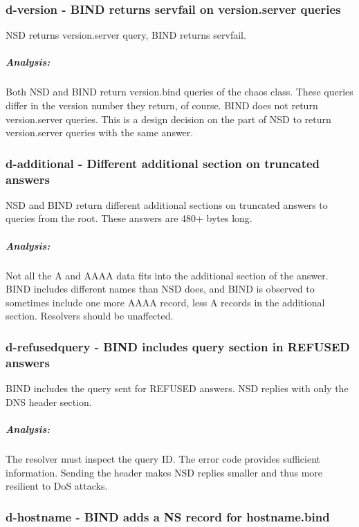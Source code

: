 \documentclass[twoside,titlepage,english]{nlnetlabs}
\begin{document}
\subsubsection{d-version - BIND returns servfail on version.server queries}
\label{d-version}

NSD returns version.server query, BIND returns servfail.

\vspace{-8pt}\subparagraph{Analysis:}

Both NSD and BIND return version.bind queries of the chaos class.
These queries differ in the version number they return, of course.
BIND does not return version.server queries. This is a design decision
on the part of NSD to return version.server queries with the same answer.


\subsubsection{d-additional - Different additional section on truncated answers}
\label{d-additional}

NSD and BIND return different additional sections on truncated answers
to queries from the root. These answers are 480+ bytes long.

\vspace{-8pt}\subparagraph{Analysis:}

Not all the A and AAAA data fits into the additional section of the answer.
BIND includes different names than NSD does, and BIND is observed to sometimes
include one more AAAA record, less A records in the additional section.
Resolvers should be unaffected.


\subsubsection{d-refusedquery - BIND includes query section in REFUSED answers}
\label{d-refusedquery}

BIND includes the query sent for REFUSED answers. NSD replies with only
the DNS header section.

\vspace{-8pt}\subparagraph{Analysis:}

The resolver must inspect the query ID. The error code provides sufficient
information. Sending the header makes NSD replies smaller and thus more 
resilient to DoS attacks.


\subsubsection{d-hostname - BIND adds a NS record for hostname.bind}
\label{d-hostname}
\end{document}
